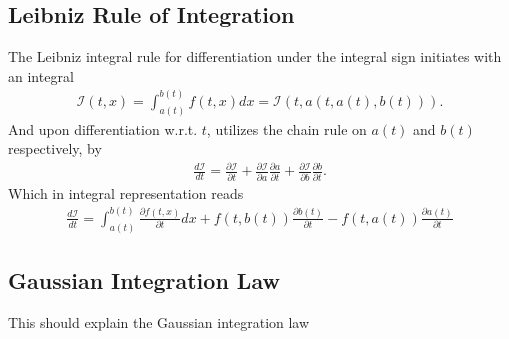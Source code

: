 \subsection{Leibniz Rule of Integration}
\label{appendix:leibniz}
The Leibniz integral rule for differentiation under the integral sign
initiates with an integral
\begin{align}
    \mathcal{I}(t, x) = \int_{a(t)}^{b(t)} f(t, x) dx = \mathcal{I}(t, a(t,
    a(t), b(t))).
\end{align}
And upon differentiation w.r.t. $t$, utilizes the chain rule on $a(t)$ and
$b(t)$ respectively, by
\begin{align}
    \frac{d\mathcal{I}}{dt} =
    \frac{\partial \mathcal{I}}{\partial t}+
    \frac{\partial \mathcal{I}}{\partial a}\frac{\partial a}{\partial t}+
    \frac{\partial \mathcal{I}}{\partial b}\frac{\partial b}{\partial t}.
\end{align}
Which in integral representation reads
\begin{align}
    \frac{d\mathcal{I}}{dt} = \int_{a(t)}^{b(t)}\frac{\partial f(t,
    x)}{\partial t} dx + f(t, b(t)) \frac{\partial b(t)}{\partial t}
    - f(t, a(t)) \frac{\partial a(t)}{\partial t}
\end{align}

\subsection{Gaussian Integration Law}
\label{appendix:gauss integration}
This should explain the Gaussian integration law












\nocite{johnson_1997}
\nocite{vallis_2017}
\nocite{constantin_tsunami}
\nocite{rupert_2009}
\nocite{mathe-physik}

\printbibliography


